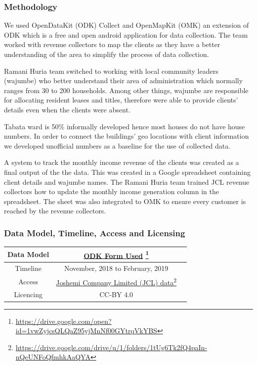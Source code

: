 \documentclass[a4paper,12pt,twoside]{article}
\begin{document}
\subsubsection{Methodology}
\begin{multicols}{2}

We used OpenDataKit (ODK) Collect and OpenMapKit (OMK) an extension of ODK which is a free and open android application for data collection. The team worked with revenue collectors to map the clients as they have a better understanding of the area to simplify the process of data collection. 

Ramani Huria team switched to working with local community leaders (wajumbe) who better understand their area of administration which normally ranges from 30 to 200 households. Among other things, wajumbe  are responsible for allocating resident leases and titles, therefore were able to provide clients’ details even when the clients were absent.

Tabata ward is 50\% informally developed hence most houses do not have house numbers. In order to connect the buildings’ geo locations with client information we developed unofficial numbers as a baseline for the use of collected data.

A system to track the monthly income revenue of the clients was created as a final output of the the data. This was created in a Google spreadsheet containing client details and wajumbe names. The Ramani Huria team trained JCL revenue collectors how to update the monthly income generation column in the spreadsheet. The sheet was also integrated to OMK to ensure every customer is reached by the revenue collectors.

\end{multicols}

\subsubsection{Data Model, Timeline, Access and Licensing}
\begin{center}
\begin{tabular}{|c|c|c|}  
 \hline
Data Model &
      \href{https://drive.google.com/open?id=1vwZyjcsQLQaZ95yjMnNf00GYtrqVkYBS}{ODK Form Used} \footnote{\url{https://drive.google.com/open?id=1vwZyjcsQLQaZ95yjMnNf00GYtrqVkYBS}} \\
 \hline
  Timeline  &  November, 2018 to February, 2019 \\
\hline  
 Access  & 
   \href{https://drive.google.com/drive/u/1/folders/1tUg6Tk2fQ4paIn-nQeUNFoQfmhkAaQYA}{Joshemi Company Limited (JCL) data}\footnote{\url{https://drive.google.com/drive/u/1/folders/1tUg6Tk2fQ4paIn-nQeUNFoQfmhkAaQYA}} \\
   
\hline 
    Licencing & CC-BY 4.0 \\
\hline
\end{tabular}
\end{center}
\end{document}

